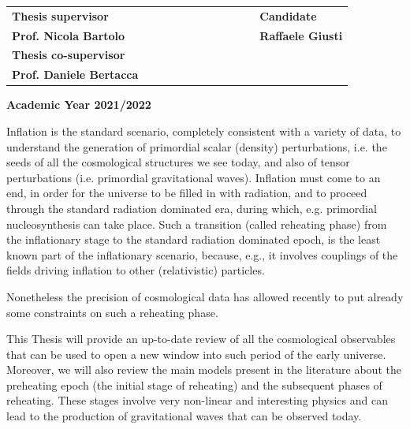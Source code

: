 \documentclass[11pt,a4paper,twoside]{book}
\newenvironment{abstract}{\cleardoublepage\thispagestyle{empty}\null\vfill\begin{center}\bfseries\abstractname\end{center}}{\vfill\null}
\begin{document}
\begin{titlepage}
		\vspace{20mm}
		\begin{spacing}{2}
			\begin{tabular}{ l  c  c c c  cc c c c c  l }
				{\Large{\bf Thesis supervisor}} &&&&&&&&&&& {\Large{\bf Candidate}}\\
				{\Large{\bf Prof. Nicola Bartolo}} &&&&&&&&&&& {\Large{\bf Raffaele Giusti}}\\
				{\Large{\bf Thesis co-supervisor}}\\
				{\Large{\bf Prof. Daniele Bertacca}}\\
			\end{tabular}
		\end{spacing}
		\vspace{15 mm}
		
		\begin{center}
			{\Large{\bf Academic Year 2021/2022}}
		\end{center}
	\end{titlepage}
	\clearpage{\pagestyle{empty}\cleardoublepage}

\begin{abstract}
	Inflation is the standard scenario, completely consistent with a variety of data, to understand the  
	generation of primordial scalar (density) perturbations, i.e.  the seeds of all the cosmological structures we  
	see today, and also of tensor perturbations (i.e. primordial gravitational waves). Inflation must come to an  
	end, in order for the universe to be filled in with radiation, and to proceed  through the standard radiation  
	dominated era, during which, e.g. primordial nucleosynthesis can take place. Such a transition (called  
	reheating phase) from the inflationary stage to the standard radiation dominated epoch, is the least known  
	part of the inflationary scenario, because, e.g., it involves couplings of the fields driving inflation to other  
	(relativistic) particles.  
	
	Nonetheless the precision of cosmological data has allowed recently to put already some constraints on  
	such a reheating phase.  
	
	This Thesis will provide an up-to-date review of all the cosmological observables that can be used to open  
	a new window into such period of the early universe. \\
	Moreover, we will also review the main models present in the literature about the preheating epoch (the initial stage of reheating) and the subsequent phases of reheating. These stages involve very non-linear and interesting physics and can lead to the production of gravitational waves that can be observed today.
\end{abstract}
	
\end{document}
